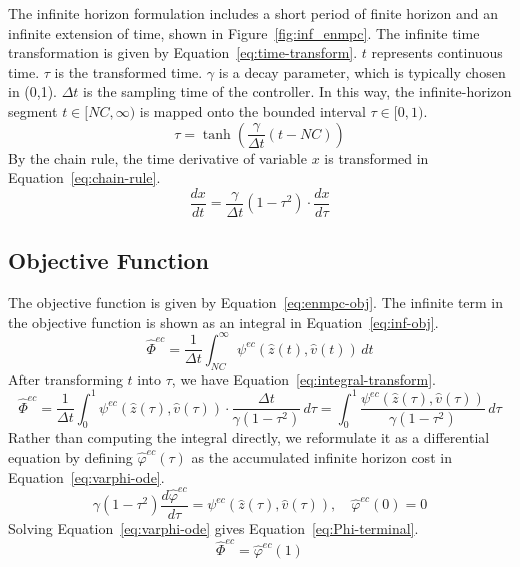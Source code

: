 \documentclass[11pt]{article}
\begin{document}
The infinite horizon formulation includes a short period of finite horizon and an infinite extension of time, shown in Figure~\ref{fig:inf_enmpc}. The infinite time transformation is given by Equation~\eqref{eq:time-transform}. $t$ represents continuous time. $\tau$ is the transformed time. $\gamma$ is a decay parameter, which is typically chosen in (0,1). $\Delta t$ is the sampling time of the controller. In this way, the infinite-horizon segment $t\in[NC,\infty)$ is mapped onto the bounded interval $\tau\in[0,1)$.
\begin{equation}
\tau = \tanh\left(\frac{\gamma}{\Delta t}(t - NC)\right) \label{eq:time-transform}
\end{equation}
By the chain rule, the time derivative of variable $x$ is transformed in Equation~\eqref{eq:chain-rule}.
\begin{equation}
\frac{dx}{dt} = \frac{\gamma}{\Delta t}(1-\tau^2)\cdot\frac{dx}{d\tau}
\label{eq:chain-rule}
\end{equation}
\subsection{Objective Function}
The objective function is given by Equation~\eqref{eq:enmpc-obj}. The infinite term in the objective function is shown as an integral in Equation~\eqref{eq:inf-obj}.
\begin{equation}
\hat{\Phi}^{ec} = \frac{1}{\Delta t}\int_{NC}^{\infty} \psi^{ec}(\hat{z}(t), \hat{v}(t))\,dt
\label{eq:inf-obj}
\end{equation}
After transforming $t$ into $\tau$, we have Equation~\eqref{eq:integral-transform}.
\begin{equation}
\hat{\Phi}^{ec} = \frac{1}{\Delta t} \int_0^1 \psi^{ec}(\hat{z}(\tau),\hat{v}(\tau)) \cdot \frac{\Delta t}{\gamma(1-\tau^2)}\,d\tau
= \int_0^1 \frac{\psi^{ec}(\hat{z}(\tau),\hat{v}(\tau))}{\gamma(1-\tau^2)}\, d\tau
\label{eq:integral-transform}
\end{equation}
Rather than computing the integral directly, we reformulate it as a differential equation by defining $\hat{\varphi}^{ec}(\tau)$ as the accumulated infinite horizon cost in Equation~\eqref{eq:varphi-ode}.
\begin{equation}
\gamma(1-\tau^2)\frac{d\hat{\varphi}^{ec}}{d\tau} =\psi^{ec}(\hat{z}(\tau),\hat{v}(\tau)),
\quad \hat{\varphi}^{ec}(0) = 0
\label{eq:varphi-ode}
\end{equation}
Solving Equation~\eqref{eq:varphi-ode} gives Equation~\eqref{eq:Phi-terminal}.
\begin{equation}
\hat{\Phi}^{ec}=\hat{\varphi}^{ec}(1)
\label{eq:Phi-terminal}
\end{equation}
\end{document}
